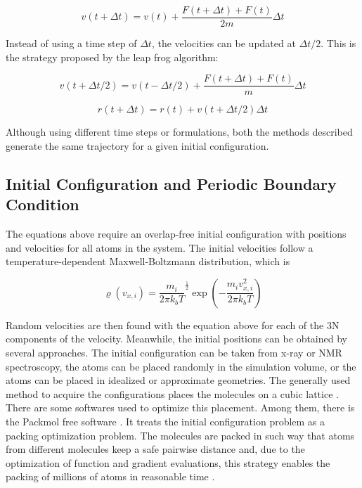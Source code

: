 \begin{equation}
v(t+ \Delta t) = v(t) +\frac{F(t+ \Delta t) +F(t)}{2m} \Delta t
\end{equation}

Instead of using a time step of $\Delta t$, the velocities can be updated at $\Delta t /2$. This is the strategy proposed by the leap frog algorithm:

\begin{equation}
v(t+ \Delta t /2) = v(t- \Delta t /2) +\frac{F(t+ \Delta t) +F(t)}{m} \Delta t
\end{equation}

\begin{equation}
r(t+ \Delta t) = r(t) +v(t+ \Delta t /2) \Delta t
\end{equation}

Although using different time steps or formulations, both the methods described  generate the same trajectory for a given initial configuration.

\subsection{Initial Configuration and Periodic Boundary Condition}

The equations above require an overlap-free initial configuration with positions and velocities for all atoms in the system. The initial velocities follow a temperature-dependent Maxwell-Boltzmann distribution, which is

\begin{equation}
\varrho (v_{x,i}) = {\frac{m_{i}}{2 \pi k_{b} T}}^{\frac{1}{2}} \exp \left (-\frac{m_{i}v_{x,i}^2}{2 \pi k_{b} T} \right)
\end{equation}

Random velocities are then found with the equation above for each of the 3N components of the velocity. Meanwhile, the initial positions can be obtained by several approaches. The initial configuration can be taken from x-ray or NMR spectroscopy, the atoms can be placed randomly in the simulation volume, or the atoms can be placed in idealized or approximate geometries. The generally used method to acquire the configurations places the molecules on a cubic lattice \cite{shell2015}. There are some softwares used to optimize this placement. Among them, there is the Packmol free software \cite{packmol}. It treats the initial configuration problem as a packing optimization problem. The molecules are packed in such way that atoms from different molecules keep a safe pairwise distance and, due to the optimization of function and gradient evaluations, this strategy enables the packing of millions of atoms in reasonable time \cite{packmol}.   


